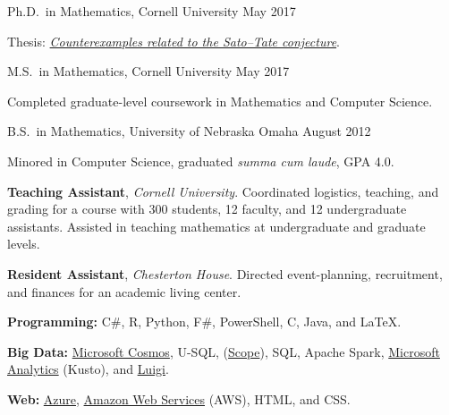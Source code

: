 \documentclass[11pt, letterpaper]{awesome-cv}
\begin{document}

\begin{cventries}

\cventry
	{Ph.D.~in Mathematics, Cornell University}
	{}{}
	{May 2017}
	{
		\begin{cvitems}
			\item{Thesis: \href{http://doi.org/10.7298/X4PN93Q3}{\emph{Counterexamples related to the Sato--Tate conjecture}}.}
		\end{cvitems}
	}
	
\cventry
	{M.S.~in Mathematics, Cornell University}
	{}{}
	{May 2017}
	{
		\begin{cvitems}
			\item{Completed graduate-level coursework in Mathematics and Computer Science.}
		\end{cvitems}
	}
	
\cventry
	{B.S.~in Mathematics, University of Nebraska Omaha}
	{}{}
	{August 2012}
	{
		\begin{cvitems}
			\item{Minored in Computer Science, graduated \emph{summa cum laude}, GPA 4.0.}
		\end{cvitems}
	}
	
\end{cventries}






\begin{cvparagraph}
\textbf{Teaching Assistant}, \emph{Cornell University}. Coordinated logistics, teaching, and grading for a course with 300 students, 12 faculty, and 12 undergraduate assistants.
Assisted in teaching mathematics at undergraduate and graduate levels.

\textbf{Resident Assistant}, \emph{Chesterton House}. Directed event-planning, recruitment, and finances for an academic living center. 
\end{cvparagraph}






\begin{cvparagraph}
\textbf{Programming:} C\#, R, Python, F\#, PowerShell, C, Java, and \LaTeX.

\textbf{Big Data:}
\href{https://docs.microsoft.com/en-us/azure/cosmos-db/introduction}{Microsoft Cosmos}, 
U-SQL, 
(\href{https://doi.org/10.14778/1454159.1454166}{Scope}),
SQL,
Apache Spark,
\href{https://docs.loganalytics.io/docs/Language-Reference}{Microsoft Analytics} (Kusto),
and 
\href{https://github.com/spotify/luigi}{Luigi}.

\textbf{Web:} 
\href{https://azure.microsoft.com/}{Azure}, 
\href{https://aws.amazon.com/}{Amazon Web Services} (AWS), 
HTML, and CSS.
\end{cvparagraph}
\end{document}

